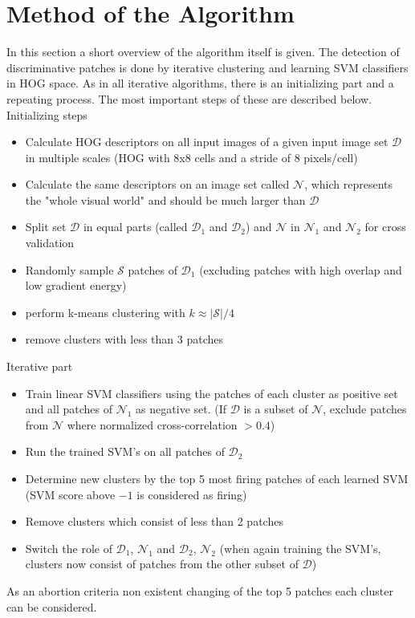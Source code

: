 \section{Method of the Algorithm}

In this section a short overview of the algorithm itself is given.
The detection of discriminative patches is done by iterative clustering and learning SVM classifiers in HOG space. As in all iterative algorithms, there is an initializing part and a repeating process. The most important steps of these are described below.\\

Initializing steps
\begin{itemize}
\item Calculate HOG descriptors on all input images of a given input image set $\mathcal{D}$ in multiple scales (HOG with 8x8 cells and a stride of 8 pixels/cell)
\item Calculate the same descriptors on an image set called $\mathcal{N}$, which represents the "whole visual world" and should be much larger than $\mathcal{D}$
\item Split set $\mathcal{D}$ in equal parts (called $\mathcal{D}_1$ and $\mathcal{D}_2$) and $\mathcal{N}$ in $\mathcal{N}_1$ and $\mathcal{N}_2$ for cross validation
\item Randomly sample $\mathcal{S}$ patches of $\mathcal{D}_1$ (excluding patches with high overlap and low gradient energy)
\item perform k-means clustering with $k \approx \lvert\mathcal{S}\rvert/4$
\item remove clusters with less than 3 patches
\end{itemize}

Iterative part
\begin{itemize}
\item Train linear SVM classifiers using the patches of each cluster as positive set and all patches of $\mathcal{N}_1$ as negative set.
(If $\mathcal{D}$ is a subset of $\mathcal{N}$, exclude patches from $\mathcal{N}$ where normalized cross-correlation $> 0.4$)
\item Run the trained SVM's on all patches of $\mathcal{D}_2$
\item Determine new clusters by the top 5 most firing patches of each learned SVM (SVM score above $-1$ is considered as firing)
\item Remove clusters which consist of less than 2 patches
\item Switch the role of $\mathcal{D}_1$, $\mathcal{N}_1$ and $\mathcal{D}_2$, $\mathcal{N}_2$ (when again training the SVM's, clusters now consist of patches from the other subset of $\mathcal{D}$)
\end{itemize}

As an abortion criteria non existent changing of the top 5 patches each cluster can be considered.